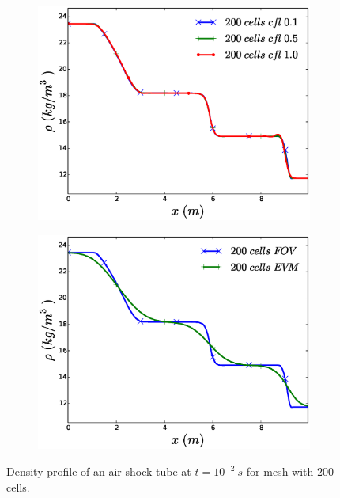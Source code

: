 \documentclass{inputs/mc2015}
\begin{document}
\begin{figure}[H]
    \centering
    \begin{subfigure}[b]{0.49\textwidth}
            \centering
            \includegraphics[width=\textwidth]{figures/air-shock-tube_out_displaced-200-cells-cfl-1-0-pts0-density-plot.eps}
            \caption{}
            \label{fig:air-tube-conv-plots-dens}
    \end{subfigure}
    \begin{subfigure}[b]{0.49\textwidth}
            \centering
            \includegraphics[width=\textwidth]{figures/air-shock-tube_out_displaced-200-cells-cfl-0-1-fo-pts0-density-plot.eps}
            \caption{}
            \label{fig:air-tube-conv-plots-vel}
    \end{subfigure}%
    \caption{Density profile of an air shock tube at $t=10^{-2} \ s$ for mesh with $200$ cells.}\label{fig:air-tube-conv-plots}
\end{figure}    
%
\end{document}
